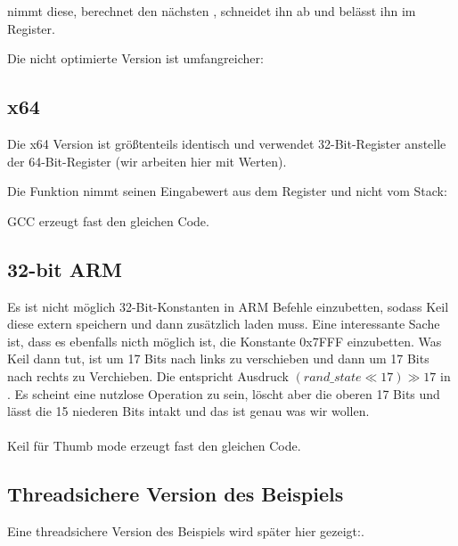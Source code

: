  nimmt diese, berechnet den nächsten , schneidet ihn ab und belässt ihn im \EAX Register.

Die nicht optimierte Version ist umfangreicher:



\subsection{x64}
Die x64 Version ist größtenteils identisch und verwendet 32-Bit-Register anstelle der 64-Bit-Register (wir arbeiten
hier mit \Tint Werten).

Die Funktion  nimmt seinen Eingabewert aus dem Register \ECX und nicht vom Stack:



GCC erzeugt fast den gleichen Code.

\subsection{32-bit ARM}


Es ist nicht möglich 32-Bit-Konstanten in ARM Befehle einzubetten, sodass Keil diese extern speichern und dann
zusätzlich laden muss. Eine interessante Sache ist, dass es ebenfalls nicth möglich ist, die Konstante 0x7FFF
einzubetten.
Was Keil dann tut, ist  um 17 Bits nach links zu verschieben und dann um 17 Bits nach rechts zu
Verchieben.
Die entspricht Ausdruck $(rand\_state \ll 17) \gg 17$ in \CCpp.
Es scheint eine nutzlose Operation zu sein, löscht aber die oberen 17 Bits und lässt die 15 niederen Bits intakt und das
ist genau was wir wollen.\\\\

\Optimizing Keil für Thumb mode erzeugt fast den gleichen Code.



\subsection{Threadsichere Version des Beispiels}
Eine threadsichere Version des Beispiels wird später hier gezeigt:. 
